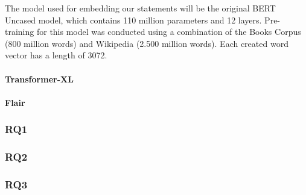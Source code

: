 The model used for embedding our statements will be the original BERT Uncased model, which contains 110 million parameters and 12 layers. 
Pre-training for this model was conducted using a combination of the Books Corpus (800 million words) and Wikipedia (2.500 million words).
Each created word vector has a length of 3072. 

\paragraph{Transformer-XL}

\paragraph{Flair}

\subsubsection{RQ1}

\subsubsection{RQ2}

\subsubsection{RQ3}
